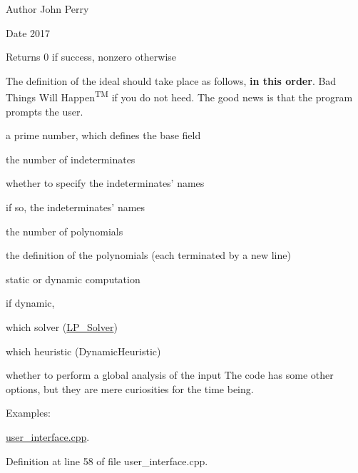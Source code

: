 \begin{DoxyAuthor}{Author}
John Perry 
\end{DoxyAuthor}
\begin{DoxyDate}{Date}
2017 
\end{DoxyDate}
\begin{DoxyReturn}{Returns}
0 if success, nonzero otherwise
\end{DoxyReturn}
The definition of the ideal should take place as follows, {\bfseries in this order}. Bad Things Will Happen\textsuperscript{TM} if you do not heed. The good news is that the program prompts the user.
\begin{DoxyEnumerate}
\item a prime number, which defines the base field
\item the number of indeterminates
\item whether to specify the indeterminates' names
\item if so, the indeterminates' names
\item the number of polynomials
\item the definition of the polynomials (each terminated by a new line)
\item static or dynamic computation
\item if dynamic,
\begin{DoxyEnumerate}
\item which solver (\hyperlink{group___c_l_s_solvers_class_l_p___solver}{L\+P\+\_\+\+Solver})
\item which heuristic (Dynamic\+Heuristic)
\item whether to perform a global analysis of the input The code has some other options, but they are mere curiosities for the time being. 
\end{DoxyEnumerate}
\end{DoxyEnumerate}\begin{Desc}
\item[Examples\+: ]\par
\hyperlink{user_interface_8cpp-example}{user\+\_\+interface.\+cpp}.\end{Desc}


Definition at line 58 of file user\+\_\+interface.\+cpp.

